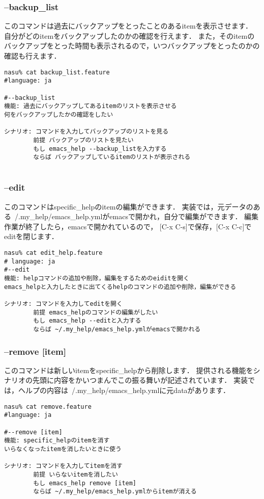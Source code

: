 \subsubsection{--backup\_list}
このコマンドは過去にバックアップをとったことのあるitemを表示させます．
自分がどのitemをバックアップしたのかの確認を行えます．
また，そのitemのバックアップをとった時間も表示されるので，いつバックアップをとったのかの確認も行えます．
\begin{lstlisting}[style=customRuby]
nasu% cat backup_list.feature
#language: ja

#--backup_list
機能: 過去にバックアップしてあるitemのリストを表示させる
何をバックアップしたかの確認をしたい

シナリオ: コマンドを入力してバックアップのリストを見る
        前提 バックアップのリストを見たい
        もし emacs_help --backup_listを入力する
        ならば バックアップしているitemのリストが表示される
        
\end{lstlisting}
\subsubsection{--edit}
このコマンドはspecific\_helpのitemの編集ができます．
実装では，元データのある~/.my\_help/emacs\_help.ymlがemacsで開かれ，自分で編集ができます．
編集作業が終了したら，emacsで開かれているので， [C-x C-s]で保存，[C-x C-c]でeditを閉じます．
\begin{lstlisting}[style=customRuby]
nasu% cat edit_help.feature
# language: ja
#--edit
機能: helpコマンドの追加や削除，編集をするためのeiditを開く
emacs_helpと入力したときに出てくるhelpのコマンドの追加や削除，編集ができる

シナリオ: コマンドを入力してeditを開く
        前提 emacs_helpのコマンドの編集がしたい
        もし emacs_help --editと入力する
        ならば ~/.my_help/emacs_help.ymlがemacsで開かれる
\end{lstlisting}
\subsubsection{--remove [item]}
このコマンドは新しいitemをspecific\_helpから削除します．
提供される機能をシナリオの先頭に内容をかいつまんでこの振る舞いが記述されています．
実装では，ヘルプの内容は~/.my\_help/emacs\_help.ymlに元dataがあります．
\begin{lstlisting}[style=customRuby]
nasu% cat remove.feature
#language: ja

#--remove [item]
機能: specific_helpのitemを消す
いらなくなったitemを消したいときに使う

シナリオ: コマンドを入力してitemを消す
        前提 いらないitemを消したい
        もし emacs_help remove [item]
        ならば ~/.my_help/emacs_help.ymlからitemが消える

\end{lstlisting}
